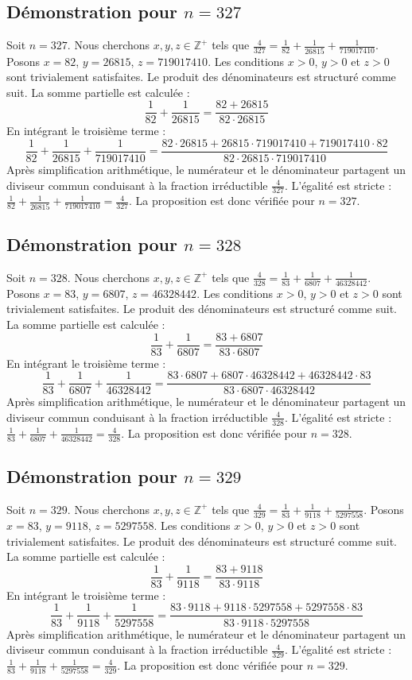 \documentclass[11pt,a4paper]{article}
\begin{document}
\subsection{Démonstration pour $n = 327$}
Soit $n = 327$. Nous cherchons $x, y, z \in \mathbb{Z}^{+}$ tels que $\frac{4}{327} = \frac{1}{82} + \frac{1}{26815} + \frac{1}{719017410}$.
Posons $x = 82$, $y = 26815$, $z = 719017410$.
Les conditions $x > 0$, $y > 0$ et $z > 0$ sont trivialement satisfaites.
Le produit des dénominateurs est structuré comme suit. La somme partielle est calculée :
$$ \frac{1}{82} + \frac{1}{26815} = \frac{82+26815}{82 \cdot 26815} $$
En intégrant le troisième terme :
$$ \frac{1}{82} + \frac{1}{26815} + \frac{1}{719017410} = \frac{82 \cdot 26815 + 26815 \cdot 719017410 + 719017410 \cdot 82}{82 \cdot 26815 \cdot 719017410} $$
Après simplification arithmétique, le numérateur et le dénominateur partagent un diviseur commun conduisant à la fraction irréductible $\frac{4}{327}$.
L'égalité est stricte : $\frac{1}{82} + \frac{1}{26815} + \frac{1}{719017410} = \frac{4}{327}$.
La proposition est donc vérifiée pour $n = 327$.
\subsection{Démonstration pour $n = 328$}
Soit $n = 328$. Nous cherchons $x, y, z \in \mathbb{Z}^{+}$ tels que $\frac{4}{328} = \frac{1}{83} + \frac{1}{6807} + \frac{1}{46328442}$.
Posons $x = 83$, $y = 6807$, $z = 46328442$.
Les conditions $x > 0$, $y > 0$ et $z > 0$ sont trivialement satisfaites.
Le produit des dénominateurs est structuré comme suit. La somme partielle est calculée :
$$ \frac{1}{83} + \frac{1}{6807} = \frac{83+6807}{83 \cdot 6807} $$
En intégrant le troisième terme :
$$ \frac{1}{83} + \frac{1}{6807} + \frac{1}{46328442} = \frac{83 \cdot 6807 + 6807 \cdot 46328442 + 46328442 \cdot 83}{83 \cdot 6807 \cdot 46328442} $$
Après simplification arithmétique, le numérateur et le dénominateur partagent un diviseur commun conduisant à la fraction irréductible $\frac{4}{328}$.
L'égalité est stricte : $\frac{1}{83} + \frac{1}{6807} + \frac{1}{46328442} = \frac{4}{328}$.
La proposition est donc vérifiée pour $n = 328$.
\subsection{Démonstration pour $n = 329$}
Soit $n = 329$. Nous cherchons $x, y, z \in \mathbb{Z}^{+}$ tels que $\frac{4}{329} = \frac{1}{83} + \frac{1}{9118} + \frac{1}{5297558}$.
Posons $x = 83$, $y = 9118$, $z = 5297558$.
Les conditions $x > 0$, $y > 0$ et $z > 0$ sont trivialement satisfaites.
Le produit des dénominateurs est structuré comme suit. La somme partielle est calculée :
$$ \frac{1}{83} + \frac{1}{9118} = \frac{83+9118}{83 \cdot 9118} $$
En intégrant le troisième terme :
$$ \frac{1}{83} + \frac{1}{9118} + \frac{1}{5297558} = \frac{83 \cdot 9118 + 9118 \cdot 5297558 + 5297558 \cdot 83}{83 \cdot 9118 \cdot 5297558} $$
Après simplification arithmétique, le numérateur et le dénominateur partagent un diviseur commun conduisant à la fraction irréductible $\frac{4}{329}$.
L'égalité est stricte : $\frac{1}{83} + \frac{1}{9118} + \frac{1}{5297558} = \frac{4}{329}$.
La proposition est donc vérifiée pour $n = 329$.
\end{document}
